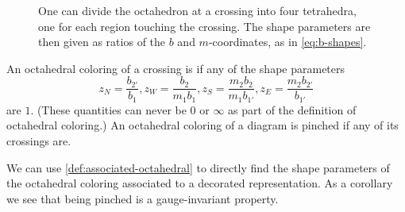 \documentclass[leqno]{sl2art}
\begin{document}
\begin{figure}
  
  \caption{%
    One can divide the octahedron at a crossing into four tetrahedra, one for each region touching the crossing.
    The shape parameters are then given as ratios of the \(b\) and \(m\)-coordinates, as in \cref{eq:b-shapes}.
  }
  \label{fig:shape-parameters-diagram}
\end{figure}


\begin{definition}
  An octahedral coloring of a crossing is %
  if any of the shape parameters
  \begin{equation}
    \label{eq:b-shapes}
    z_N
    =
    \frac{
      b_{2'}  
      }{
      b_1   
    }
    ,
    z_W
    =
    \frac{
      b_2
      }{
      m_1 b_1
    }
    ,
    z_S
    =
    \frac{
      m_2 b_2 
      }{
      m_1 b_{1'}
    }
    ,
    z_E
    =
    \frac{
      m_2 b_{2'}
      }{
      b_{1'}
    }
  \end{equation}
  are \(1\).
  (These quantities can never be \(0\) or \(\infty\) as part of the definition of octahedral coloring.)
  An octahedral coloring of a diagram is pinched if any of its crossings are.
\end{definition}




We can use \cref{def:associated-octahedral} to directly find the shape parameters of the octahedral coloring associated to a decorated representation.
As a corollary we see that being pinched is a gauge-invariant property.
\end{document}
